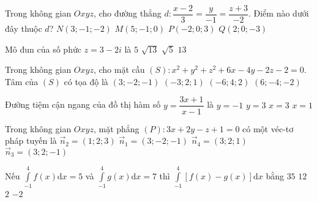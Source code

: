 \begin{ex}%
	Trong không gian $Oxyz$, cho đường thẳng $d\colon \dfrac{x-2}{3}=\dfrac{y}{-1}=\dfrac{z+3}{-2}$. Điểm nào dưới đây thuộc $d$?	
	\choice
	{$N(3;-1;-2)$}
	{$M(5;-1;0)$}
	{$P(-2;0;3)$}
	{\True $Q(2;0;-3)$}
\end{ex}
\begin{ex}%
	Mô đun của số phức $z=3-2 i$ là	
	\choice
	{$5$}
	{\True $\sqrt{13}$}
	{$\sqrt{5}$}
	{$13$}
\end{ex}
\begin{ex}%
	Trong không gian $O x y z$, cho mặt cầu $(S)\colon x^2+y^2+z^2+6 x-4 y-2 z-2=0$. Tâm của $(S)$ có tọa độ là	
	\choice
	{$(3;-2;-1)$}
	{\True $(-3;2;1)$}
	{$(-6;4;2)$}
	{$(6;-4;-2)$}
\end{ex}
\begin{ex}%
	Đường tiệm cận ngang của đồ thị hàm số $y=\dfrac{3 x+1}{x-1}$ là	
	\choice
	{$y=-1$}
	{\True $y=3$}
	{$x=3$}
	{$x=1$}
\end{ex}
\begin{ex}%
	Trong không gian $O x y z$, mặt phẳng $(P)\colon 3 x+2 y-z+1=0$ có một véc-tơ pháp tuyến là
	\choice
	{$\overrightarrow{n}_2=(1 ; 2 ; 3)$}
	{$\overrightarrow{n}_1=(3;-2;-1)$}
	{$\overrightarrow{n}_4=(3;2;1)$}
	{\True $\overrightarrow{n}_3=(3;2;-1)$}
\end{ex}
\begin{ex}%
	Nếu $\displaystyle\int\limits_{-1}^4 f(x) \mathrm{d} x=5$ và $\displaystyle\int\limits_{-1}^4 g(x) \mathrm{d} x=7$ thì $\displaystyle\int\limits_{-1}^4[f(x)-g(x)] \mathrm{d} x$ bằng	
	\choice
	{$35$}
	{$12$}
	{$2$}
	{\True $-2$}
\end{ex}
